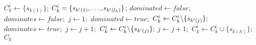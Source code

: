 \begin{algorithmic}[1] %
    \State $C_k^i \gets \{s_{k(1)}\}$;
      \State $C_k^i = \{s_{{k'}(1)}, \ldots, s_{{k'}(l_h)}\}$;
      \State $dominated \gets false;$
      \State $dominates \gets false;$
      \State $j \gets 1;$
          \State $dominated \gets true;$
          \State $C_k^i \gets C_k^i\backslash\{s_{{k'}(j)}\};$
          \State $dominates \gets true;$
        \EndIf
        \State $j \gets j + 1;$
      \EndWhile
            \State $C_k^i \gets C_k^i \backslash \{s_{{k'}(j)}\};$
          \EndIf
          \State $j \gets j + 1;$
        \EndWhile
        \State $C_k^i \gets C_k^i \cup \{s_{k(h)}\};$
      \EndIf
    \EndFor
  \State \Return $C_k$
  \EndFunction
\end{algorithmic}
